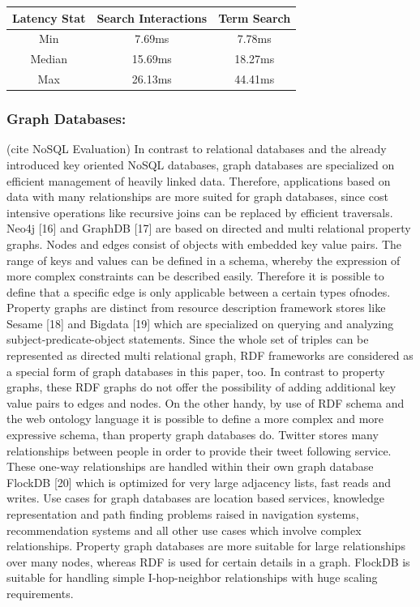 \begin{tabular}{|c|c|c|}
\hline 
Latency Stat & Search Interactions & Term Search \\ 
\hline 
Min & 7.69ms & 7.78ms \\ 
\hline 
Median & 15.69ms & 18.27ms \\ 
\hline 
Max & 26.13ms & 44.41ms \\ 
\hline 
\end{tabular} 

\subsubsection{Graph Databases:}
(cite NoSQL Evaluation) In contrast to relational databases and the already introduced key oriented NoSQL databases, graph databases are specialized on efficient management of heavily linked data. Therefore, applications based on data with many relationships are more suited for graph databases, since cost intensive operations like recursive joins can be replaced by efficient traversals.
Neo4j [16] and GraphDB [17] are based on directed and multi relational property graphs. Nodes and edges consist of objects with embedded key value pairs. The range of keys and values can be defined in a schema, whereby the expression of more complex constraints can be described easily. Therefore it is possible to define that a specific edge is only applicable between a certain types ofnodes.
Property graphs are distinct from resource description framework stores like Sesame [18] and Bigdata [19] which are specialized on querying and analyzing subject-predicate-object statements. Since the whole set of triples can be represented as directed multi relational graph, RDF frameworks are considered as a special form of graph databases in this paper, too. In contrast to property graphs, these RDF graphs do not offer the possibility of adding additional key value pairs to edges and nodes. On the other handy, by use of RDF schema and the web ontology language it is possible to define a more complex and more expressive schema, than property graph databases do.
Twitter stores many relationships between people in order to provide their tweet following service. These one-way relationships are handled within their own graph database FlockDB [20] which is optimized for very large adjacency lists, fast reads and writes.
Use cases for graph databases are location based services, knowledge representation and path finding problems raised in navigation systems, recommendation systems and all other use cases which involve complex relationships. Property graph databases are more suitable for large relationships over many nodes, whereas RDF is used for certain details in a graph. FlockDB is suitable for handling simple I-hop-neighbor relationships with huge scaling requirements.
